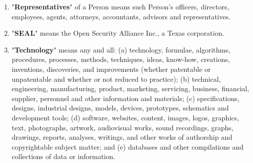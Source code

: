 \begin{enumerate}[label=\Alph*.]
    \item "\textbf{Representatives}" of a Person means such Person's officers, directors, employees, agents, attorneys, accountants, advisors and representatives.

    \item "\textbf{SEAL}" means the Open Security Alliance Inc., a Texas corporation.

    \item "\textbf{Technology}" means any and all: (a) technology, formulae, algorithms, procedures, processes, methods, techniques, ideas, know-how, creations, inventions, discoveries, and improvements (whether patentable or unpatentable and whether or not reduced to practice); (b) technical, engineering, manufacturing, product, marketing, servicing, business, financial, supplier, personnel and other information and materials; (c) specifications, designs, industrial designs, models, devices, prototypes, schematics and development tools; (d) software, websites, content, images, logos, graphics, text, photographs, artwork, audiovisual works, sound recordings, graphs, drawings, reports, analyses, writings, and other works of authorship and copyrightable subject matter; and (e) databases and other compilations and collections of data or information.
\end{enumerate}

